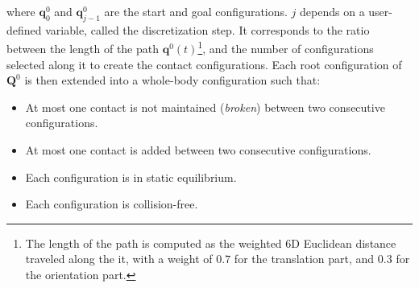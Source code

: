 \documentclass[journal]{IEEEtran}
\begin{document}
where $\mathbf{q}^0_{0}$ and $\mathbf{q}^0_{j-1}$ are the start and goal configurations. %
$j$ depends on a user-defined variable, called the discretization step. It corresponds to the ratio between the length of the path $\mathbf{q}^0(t)$\footnote{The length of the path is computed as the weighted 6D Euclidean distance
traveled along the it, with a weight of $0.7$ for the translation part, and $0.3$ for the orientation part.}, and the number
of configurations selected along it to create the contact configurations. 
Each root configuration of $\mathbf{Q}^0$ is then extended into a whole-body configuration such that:
\begin{itemize} 
\item At most one contact is not maintained (\textit{broken}) between two consecutive configurations.
\item At most one contact is added between two consecutive configurations.
\item Each configuration is in static equilibrium.
\item Each configuration is collision-free.
\end{itemize} 



\end{document}

